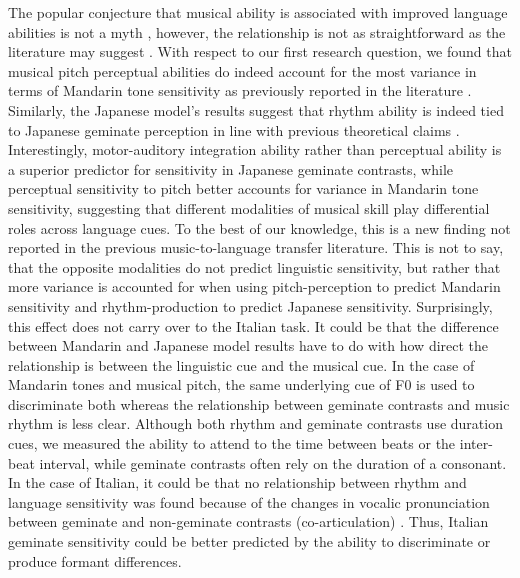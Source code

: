 \documentclass[a4paper]{article}
\begin{document}
The popular conjecture that musical ability is associated with improved language abilities is not a myth \cite{Slevc_Miyake_2006b}, however, the relationship is not as straightforward as the literature may suggest \cite{neves_et_al_2022_music}. With respect to our first research question, we found that musical pitch perceptual abilities do indeed account for the most variance in terms of Mandarin tone sensitivity as previously reported in the literature \cite{zheng_et_al_2018_pitch}. Similarly, the Japanese model's results suggest that rhythm ability is indeed tied to Japanese geminate perception in line with previous theoretical claims \cite{lofqvist_2017_effect}. Interestingly, motor-auditory integration ability rather than perceptual ability is a superior predictor for sensitivity in Japanese geminate contrasts, while perceptual sensitivity to pitch better accounts for variance in Mandarin tone sensitivity, suggesting that different modalities of musical skill play differential roles across language cues. To the best of our knowledge, this is a new finding not reported in the previous music-to-language transfer literature. This is not to say, that the opposite modalities do not predict linguistic sensitivity, but rather that more variance is accounted for when using pitch-perception to predict Mandarin sensitivity and rhythm-production to predict Japanese sensitivity. Surprisingly, this effect does not carry over to the Italian task. It could be that the difference between Mandarin and Japanese model results have to do with how direct the relationship is between the linguistic cue and the musical cue. In the case of Mandarin tones and musical pitch, the same underlying cue of F0 is used to discriminate both whereas the relationship between geminate contrasts and music rhythm is less clear. Although both rhythm and geminate contrasts use duration cues, we measured the ability to attend to the time between beats or the inter-beat interval, while geminate contrasts often rely on the duration of a consonant. In the case of Italian, it could be that no relationship between rhythm and language sensitivity was found because of the changes in vocalic pronunciation between geminate and non-geminate contrasts (co-articulation) \cite{Tsukada_Cox_Hajek_Hirata_2017}. Thus, Italian geminate sensitivity could be better predicted by the ability to discriminate or produce formant differences. 
\end{document}
